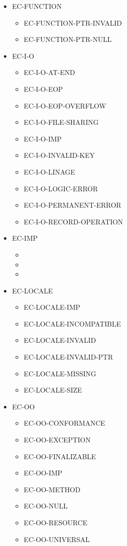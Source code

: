 \begin{itemize}
\item EC-FUNCTION
  \begin{itemize}
  \item EC-FUNCTION-PTR-INVALID
  \item EC-FUNCTION-PTR-NULL
  \end{itemize}

\item EC-I-O
  \begin{itemize}
  \item EC-I-O-AT-END
  \item EC-I-O-EOP
  \item EC-I-O-EOP-OVERFLOW
  \item EC-I-O-FILE-SHARING
  \item EC-I-O-IMP
  \item EC-I-O-INVALID-KEY
  \item EC-I-O-LINAGE
  \item EC-I-O-LOGIC-ERROR
  \item EC-I-O-PERMANENT-ERROR
  \item EC-I-O-RECORD-OPERATION
  \end{itemize}

\item EC-IMP
  \begin{itemize}
  \item {}
  \item {}
  \item {}
  \end{itemize}

\item EC-LOCALE
  \begin{itemize}
  \item EC-LOCALE-IMP
  \item EC-LOCALE-INCOMPATIBLE
  \item EC-LOCALE-INVALID
  \item EC-LOCALE-INVALID-PTR
  \item EC-LOCALE-MISSING
  \item EC-LOCALE-SIZE
  \end{itemize}

\item EC-OO
  \begin{itemize}
  \item EC-OO-CONFORMANCE
  \item EC-OO-EXCEPTION
  \item EC-OO-FINALIZABLE
  \item EC-OO-IMP
  \item EC-OO-METHOD
  \item EC-OO-NULL
  \item EC-OO-RESOURCE
  \item EC-OO-UNIVERSAL
  \end{itemize}


\end{itemize}
